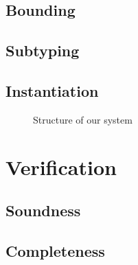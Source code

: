 \documentclass{llncs}
\begin{document}
\subsection{Bounding}
\subsection{Subtyping}
\subsection{Instantiation}

\begin{figure}

\end{figure}

\begin{figure}

\label{fig:cons}
\caption{Structure of our system}
\end{figure}
\begin{figure}

\end{figure}
\begin{figure}

\end{figure}
\begin{figure}

\end{figure}
\begin{figure}

\end{figure}
\begin{figure}

\end{figure}


\section{Verification}
\subsection{Soundness}
\subsection{Completeness}
\end{document}
